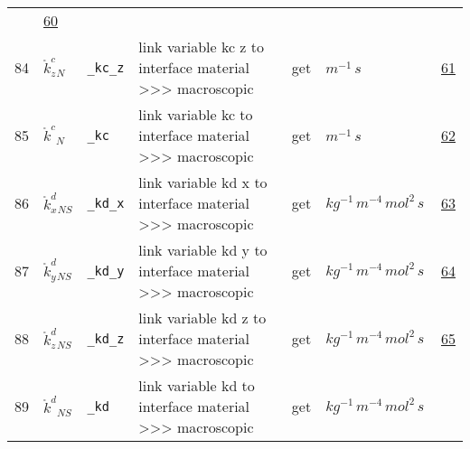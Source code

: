 \begin{longtable}{|p{1cm}|p{2.5cm}|p{4.5cm}|p{8cm}|p{3.0cm}|p{3cm}|p{1cm}|}
             & \hyperlink{"e:60"}{ 60 }
                 \\
    84
             & \hypertarget{"v:84"}{ $ {{\mathring k^c_z}}{_{N}} $}
             & \verb|_kc_z|
             & link variable kc z to interface material >>> macroscopic
             & \begin{lay}get \end{lay}
             & $ m^{-1} \,s \, $
             & \hyperlink{"e:61"}{ 61 }
                 \\
    85
             & \hypertarget{"v:85"}{ $ {{\mathring k^c}}{_{N}} $}
             & \verb|_kc|
             & link variable kc to interface material >>> macroscopic
             & \begin{lay}get \end{lay}
             & $ m^{-1} \,s \, $
             & \hyperlink{"e:62"}{ 62 }
                 \\
    86
             & \hypertarget{"v:86"}{ $ {{\mathring k^d_x}}{_{{N S}}} $}
             & \verb|_kd_x|
             & link variable kd x to interface material >>> macroscopic
             & \begin{lay}get \end{lay}
             & $ kg^{-1} \,m^{-4} \,mol^{2} \,s \, $
             & \hyperlink{"e:63"}{ 63 }
                 \\
    87
             & \hypertarget{"v:87"}{ $ {{\mathring k^d_y}}{_{{N S}}} $}
             & \verb|_kd_y|
             & link variable kd y to interface material >>> macroscopic
             & \begin{lay}get \end{lay}
             & $ kg^{-1} \,m^{-4} \,mol^{2} \,s \, $
             & \hyperlink{"e:64"}{ 64 }
                 \\
    88
             & \hypertarget{"v:88"}{ $ {{\mathring k^d_z}}{_{{N S}}} $}
             & \verb|_kd_z|
             & link variable kd z to interface material >>> macroscopic
             & \begin{lay}get \end{lay}
             & $ kg^{-1} \,m^{-4} \,mol^{2} \,s \, $
             & \hyperlink{"e:65"}{ 65 }
                 \\
    89
             & \hypertarget{"v:89"}{ $ {{\mathring k^d}}{_{{N S}}} $}
             & \verb|_kd|
             & link variable kd to interface material >>> macroscopic
             & \begin{lay}get \end{lay}
             & $ kg^{-1} \,m^{-4} \,mol^{2} \,s \, $

\end{longtable}
